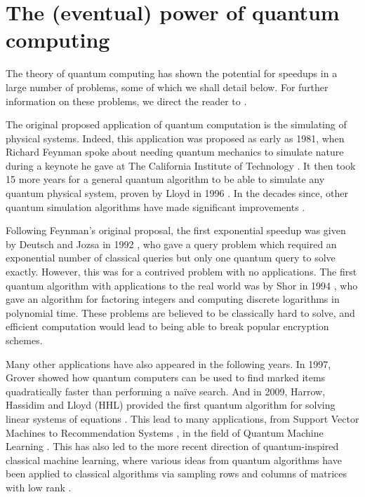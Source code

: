 \section{The (eventual) power of quantum computing}
\label{sec:eventual-power}

The theory of quantum computing has shown the potential for speedups in a large number of problems, some of which we shall detail below. For further information on these problems, we direct the reader to \cite{montanaro2016}.

The original proposed application of quantum computation is the simulating of physical systems. Indeed, this application was proposed as early as 1981, when Richard Feynman spoke about needing quantum mechanics to simulate nature during a keynote he gave at The California Institute of Technology \cite{feynman1982}. It then took 15 more years for a general quantum algorithm to be able to simulate any quantum physical system, proven by Lloyd in 1996 \cite{lloyd1996}. In the decades since, other quantum simulation algorithms have made significant improvements \cite{berry2015, berry2015stoc, low2017}.

Following Feynman's original proposal, the first exponential speedup was given by Deutsch and Jozsa in 1992 \cite{deutsch1992}, who gave a query problem which required an exponential number of classical queries but only one quantum query to solve exactly. However, this was for a contrived problem with no applications. The first quantum algorithm with applications to the real world was by Shor in 1994 \cite{shor1994}, who gave an algorithm for factoring integers and computing discrete logarithms in polynomial time. These problems are believed to be classically hard to solve, and efficient computation would lead to being able to break popular encryption schemes\cite{katz2007}.

Many other applications have also appeared in the following years. In 1997, Grover \cite{grover96} showed how quantum computers can be used to find marked items quadratically faster than performing a na\"ive search. And in 2009, Harrow, Hassidim and Lloyd (HHL) provided the first quantum algorithm for solving linear systems of equations \cite{harrow2009}. This lead to many applications, from Support Vector Machines \cite{rebentrost2014} to Recommendation Systems \cite{kerenidis2017}, in the field of Quantum Machine Learning \cite{wittek2014, schuld2014, adcock2015, biamonte2017}. This has also led to the more recent direction of quantum-inspired classical machine learning, where various ideas from quantum algorithms have been applied to classical algorithms via sampling rows and columns of matrices with low rank \cite{tang2019, tang2018, gilyen2018, arrazola2019, chia2019, jethwani2019}.

